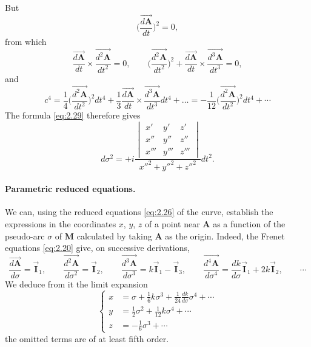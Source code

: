 \documentclass[leqno,11pt]{book}
\numberwithin{equation}{chapter}
\theoremstyle{shape1}
\theoremstyle{shapesmall}
\newcommand{\rvec}[1]{\vec{\mathbf{#1}}}
\newcommand{\ivec}{\rvec{I}}
\begin{document}
But
\[
\biggl(\frac{\overrightarrow{d\mathbf{A}}}{dt}\biggr)^{2}=0,
\]
from which
\[
\frac{\overrightarrow{d\mathbf{A}}}{dt}\times\frac{\overrightarrow{d^{2}\mathbf{A}}}{dt^{2}}=0,\qquad\biggl(\frac{\overrightarrow{d^{2}\mathbf{A}}}{dt^{2}}\biggr)^{2}+\frac{\overrightarrow{d\mathbf{A}}}{dt}\times\frac{\overrightarrow{d^{3}\mathbf{A}}}{dt^{3}}=0,
\]
and
\[
c^{4}=\frac{1}{4}\biggl(\frac{\overrightarrow{d^{2}\mathbf{A}}}{dt^{2}}\biggr)^{2}dt^{4}+\frac{1}{3}\frac{\overrightarrow{d\mathbf{A}}}{dt}\times\frac{\overrightarrow{d^{3}\mathbf{A}}}{dt^{3}}dt^{4}+\dots=-\frac{1}{12}\biggl(\frac{\overrightarrow{d^{2}\mathbf{A}}}{dt^{2}}\biggr)^{2}dt^{4}+\cdots
\]
The formula \eqref{eq:2.29} therefore gives
\[
d\sigma^{2}=+i\frac{
  \begin{vmatrix}
  x'&y'&z'\\
  x''&y''&z''\\
  x'''&y'''&z'''    
  \end{vmatrix}
}{x''^{2}+y''^{2}+z''^{2}}dt^{2}.
\]

\paragraph{Parametric reduced equations.}
\label{sec:41}
We can, using the reduced equations \eqref{eq:2.26} of the curve, establish the expressions in the coordinates $x$, $y$, $z$ of a point near $\mathbf{A}$ as a function of the pseudo-arc $\sigma$ of $\mathbf{M}$ calculated by taking $\mathbf{A}$ as the origin. Indeed, the Frenet equations \eqref{eq:2.20} give, on successive derivations,
\[
\frac{\overrightarrow{d\mathbf{A}}}{d\sigma}=\ivec_{1},\qquad
\frac{\overrightarrow{d^{2}\mathbf{A}}}{d\sigma^{2}}=\ivec_{2},\qquad
\frac{\overrightarrow{d^{3}\mathbf{A}}}{d\sigma^{3}}=k\ivec_{1}-\ivec_{3},\qquad
\frac{\overrightarrow{d^{4}\mathbf{A}}}{d\sigma^{4}}=\frac{dk}{d\sigma}\ivec_{1}+2k\ivec_{2},\qquad
\cdots
\]
We deduce from it the limit expansion
\begin{equation}
  \label{eq:2.30}
  \left\{
    \begin{aligned}
      x&=\sigma+\frac{1}{6}k\sigma^{3}+\frac{1}{24}\frac{dk}{d\sigma}\sigma^{4}+\cdots\\
      y&=\frac{1}{2}\sigma^{2}+\frac{1}{12}k\sigma^{4}+\cdots\\
      z&=-\frac{1}{6}\sigma^{3}+\cdots
    \end{aligned}
  \right.
\end{equation}
the omitted terms are of at least fifth order.
\end{document}
